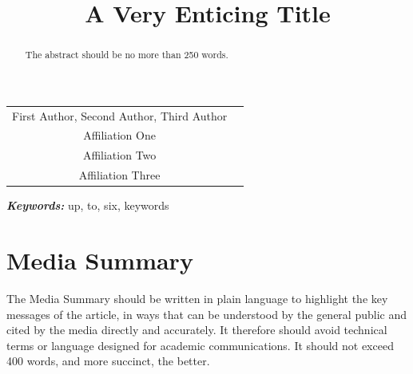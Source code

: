 \documentclass[]{hdsr}
\begin{document}




\begin{center}

  \title{A Very Enticing Title}
  \maketitle

  \thispagestyle{empty}
  
  \vspace*{.2in}

  \begin{tabular}{cc}
    First Author\upstairs{\affilone,*}, Second Author\upstairs{\affilone}, Third Author\upstairs{\affilthree}
   \\[0.25ex]
   {\small \upstairs{\affilone} Affiliation One} \\
   {\small \upstairs{\affiltwo} Affiliation Two} \\
   {\small \upstairs{\affilthree} Affiliation Three} \\
  \end{tabular}
  
  \vspace*{0.4in}

\begin{abstract}
The abstract should be no more than 250 words.
\end{abstract}
\end{center}

\vspace*{0.15in}
\hspace{10pt}
  \small	
  \textbf{\textit{Keywords: }} {up, to, six, keywords}
  
\copyrightnotice

\section*{Media Summary}
The Media Summary should be written in plain language to highlight the key messages of
the article, in ways that can be understood by the general public and cited by the media 
directly and accurately.  It therefore should avoid technical terms or language designed for
academic communications. It should not exceed 400 words, and more succinct, the better.
\end{document}

